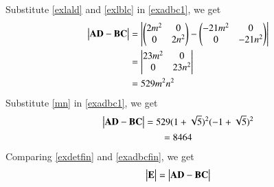 \documentclass[journal,12pt,twocolumn]{IEEEtran}
\begin{document}
Substitute \eqref{exlald} and \eqref{exlblc} in \eqref{exadbc1}, we get
\begin{align}
    \begin{vmatrix}\mathbf{A}\mathbf{D}-\mathbf{B}\mathbf{C}\end{vmatrix}&=\begin{vmatrix}\begin{pmatrix}2m^2&0\\0&2n^2\end{pmatrix}-\begin{pmatrix}-21m^2&0\\0&-21n^2\end{pmatrix}\end{vmatrix}\\
    &=\begin{vmatrix}23m^2&0\\0&23n^2\end{vmatrix}\\
    &=529m^2n^2\label{exadbc1}
\end{align}
Substitute \eqref{mn} in \eqref{exadbc1}, we get
\begin{multline}
    \begin{vmatrix}\mathbf{A}\mathbf{D}-\mathbf{B}\mathbf{C}\end{vmatrix}=529(1+\sqrt{5})^2(-1+\sqrt{5})^2\\=8464\label{exadbcfin}
\end{multline}
Comparing \eqref{exdetfin} and \eqref{exadbcfin}, we get
\begin{align}
    \begin{vmatrix}\mathbf{E}\end{vmatrix}=\begin{vmatrix}\mathbf{A}\mathbf{D}-\mathbf{B}\mathbf{C}\end{vmatrix}
\end{align}
\end{document}
